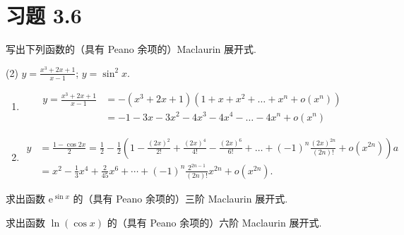 \section*{习题 3.6}

\begin{exercise}[3.6.1]
    写出下列函数的（具有 Peano 余项的）Maclaurin 展开式.
    \begin{tasks}(2)
        \task $y = \frac{x^3 + 2x + 1}{x - 1}$;
        \task $y = \sin^2 x$.
    \end{tasks}
\end{exercise}

\begin{solution}
    \begin{enumerate}
        \item \begin{align*}
                  y = \frac{x^3 + 2x + 1}{x - 1} & = -(x^3 + 2x + 1)(1 + x + x^2 + \dots + x^n + o(x^n))  \\
                                                 & = -1 - 3x - 3x^2 - 4x^3 - 4x^4 - \dots - 4x^n + o(x^n)
              \end{align*}
        \item \begin{align*}
                  y & = \frac{1-\cos 2x}{2} = \frac{1}{2} - \frac{1}{2}\left(1 - \frac{(2x)^2}{2!} + \frac{(2x)^4}{4!} - \frac{(2x)^6}{6!} + \dots + (-1)^n \frac{(2x)^{2n}}{(2n)!} + o(x^{2n})\right) a \\
                    & = x^2 - \frac{1}{3}x^4 + \frac{2}{45}x^6 + \cdots + (-1)^n \frac{2^{2n-1}}{(2n)!} x^{2n} + o(x^{2n}).
              \end{align*}
    \end{enumerate}
\end{solution}

\begin{exercise}[3.6.2]
    求出函数 $\mathrm{e}^{\sin x}$ 的（具有 Peano 余项的）三阶 Maclaurin 展开式.
\end{exercise}

\begin{exercise}[3.6.3]
    求出函数 $\ln(\cos x)$ 的（具有 Peano 余项的）六阶 Maclaurin 展开式.
\end{exercise}

